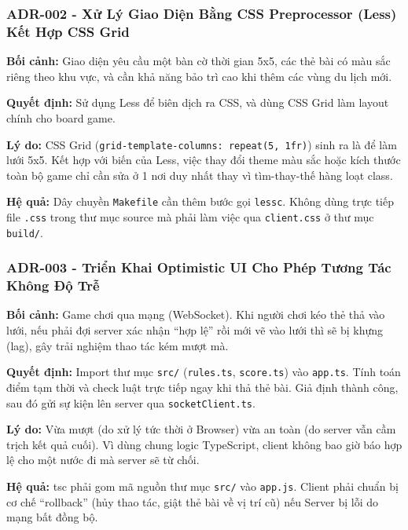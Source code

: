 \subsubsection*{ADR-002 - Xử Lý Giao Diện Bằng CSS Preprocessor (Less) Kết Hợp CSS Grid}

\textbf{Bối cảnh:} Giao diện yêu cầu một bàn cờ thời gian 5x5, các thẻ bài có màu sắc riêng theo khu vực, và cần khả năng bảo trì cao khi thêm các vùng du lịch mới.

\textbf{Quyết định:} Sử dụng Less để biên dịch ra CSS, và dùng CSS Grid làm layout chính cho board game.

\textbf{Lý do:} CSS Grid (\texttt{grid-template-columns: repeat(5, 1fr)}) sinh ra là để làm lưới 5x5. Kết hợp với biến của Less, việc thay đổi theme màu sắc hoặc kích thước toàn bộ game chỉ cần sửa ở 1 nơi duy nhất thay vì tìm-thay-thế hàng loạt class.

\textbf{Hệ quả:}
Dây chuyền \texttt{Makefile} cần thêm bước gọi \texttt{lessc}. Không dùng trực tiếp file \texttt{.css} trong thư mục source mà phải làm việc qua \texttt{client.css} ở thư mục \texttt{build/}.


\subsubsection*{ADR-003 - Triển Khai Optimistic UI Cho Phép Tương Tác Không Độ Trễ}

\textbf{Bối cảnh:} Game chơi qua mạng (WebSocket). Khi người chơi kéo thẻ thả vào lưới, nếu phải đợi server xác nhận ``hợp lệ'' rồi mới vẽ vào lưới thì sẽ bị khựng (lag), gây trải nghiệm thao tác kém mượt mà.

\textbf{Quyết định:} Import thư mục \texttt{src/} (\texttt{rules.ts}, \texttt{score.ts}) vào \texttt{app.ts}. Tính toán điểm tạm thời và check luật trực tiếp ngay khi thả thẻ bài. Giả định thành công, sau đó gửi sự kiện lên server qua \texttt{socketClient.ts}.

\textbf{Lý do:} Vừa mượt (do xử lý tức thời ở Browser) vừa an toàn (do server vẫn cầm trịch kết quả cuối). Vì dùng chung logic TypeScript, client không bao giờ báo hợp lệ cho một nước đi mà server sẽ từ chối.

\textbf{Hệ quả:} tsc phải gom mã nguồn thư mục \texttt{src/} vào \texttt{app.js}. Client phải chuẩn bị cơ chế ``rollback'' (hủy thao tác, giật thẻ bài về vị trí cũ) nếu Server bị lỗi do mạng bất đồng bộ.

